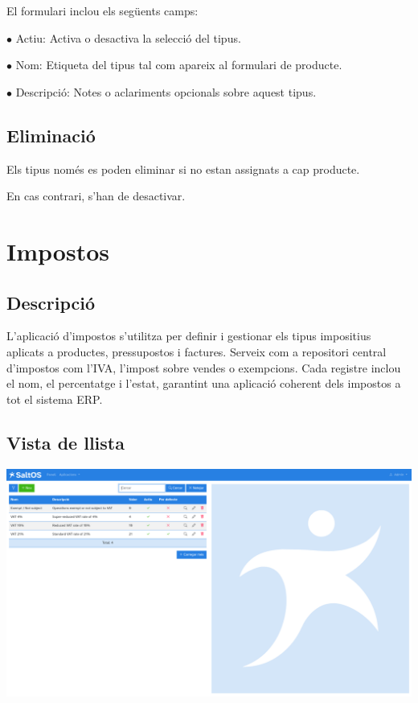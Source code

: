 \documentclass[a4paper]{article}
\begin{document}
El formulari inclou els següents camps:

\begin{compactitem}
\item[\color{myblue}$\bullet$] Actiu: Activa o desactiva la selecció del tipus.
\item[\color{myblue}$\bullet$] Nom: Etiqueta del tipus tal com apareix al formulari de producte.
\item[\color{myblue}$\bullet$] Descripció: Notes o aclariments opcionals sobre aquest tipus.
\end{compactitem}

\hypertarget{toc165}{}
\subsection{Eliminació}

Els tipus només es poden eliminar si no estan assignats a cap producte.

En cas contrari, s'han de desactivar.


\hypertarget{toc166}{}
\section{Impostos}

\hypertarget{toc167}{}
\subsection{Descripció}

L'aplicació d'impostos s'utilitza per definir i gestionar els tipus impositius aplicats a productes, pressupostos i factures.
Serveix com a repositori central d'impostos com l'IVA, l'impost sobre vendes o exempcions.
Cada registre inclou el nom, el percentatge i l'estat, garantint una aplicació coherent dels impostos a tot el sistema ERP.

\hypertarget{toc168}{}
\subsection{Vista de llista}

\begin{center}\includegraphics[width=1\textwidth]{../ujest/snaps/test-screenshots-js-screenshots-sales-taxes-list-ca-es-1-snap.png}\end{center}
\end{document}
